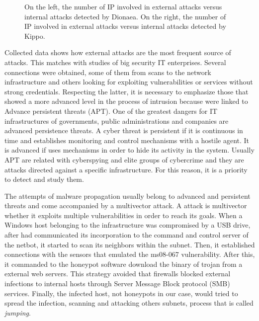 \documentclass[a4paper]{llncs}
\begin{document}
\begin{figure}[h]
	\label{fig:intvsextDionaea}
	\label{fig:intvsextKippo}
	\caption{On the left, the number of IP involved in external attacks versus internal attacks detected by Dionaea. On the right, the number of IP involved in external attacks versus internal attacks detected by Kippo.}
\end{figure}

Collected data shows how external attacks are the most frequent source of attacks. This matches with studies of big security IT enterprises\cite{verizon-2015}. Several connections were obtained, some of them from scans to the network infrastructure and others looking for exploiting vulnerabilities or services without strong credentials. Respecting the latter, it is necessary to emphasize those that showed a more advanced level in the process of intrusion because were linked to Advance persistent threats (APT). One of the greatest dangers for IT infrastructures of governments, public administrations and companies are advanced persistence threats. A cyber threat is persistent if it is continuous in time and establishes monitoring and control mechanisms with a hostile agent. It is advanced if uses mechanisms in order to hide its activity in the system. Usually APT are related with cyberspying and elite groups of cybercrime and they are attacks directed against a specific infrastructure. For this reason, it is a priority to detect and study them.

The attempts of malware propagation usually belong to advanced and persistent threats and come accompanied by a multivector attack. A attack is multivector whether it exploits multiple vulnerabilities in order to reach its goals. When a Windows host belonging to the infrastructure was compromised by a USB drive, after had communicated its incorporation to the command and control server of the netbot, it started to scan its neighbors within the subnet. Then, it established connections with the sensors that  emulated the ms08-067\cite{ms08067} vulnerability. After this, it commanded to the honeypot software download the binary of trojan from a external web servers. This strategy avoided that firewalls blocked external infections to internal hosts through Server Message Block protocol (SMB) services. Finally, the infected host, not honeypots in our case, would tried to spread the infection, scanning and attacking others subnets, process that is called {\it jumping}.
\end{document}
